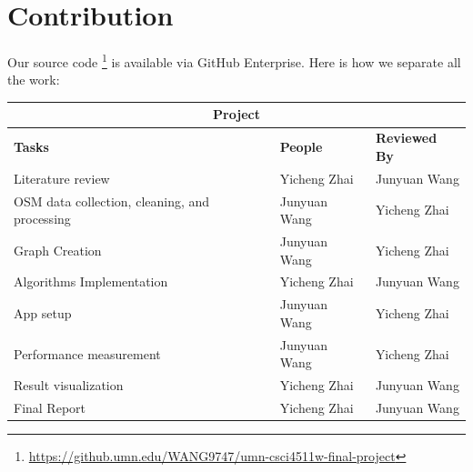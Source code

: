 \documentclass[12pt]{article}
\begin{document}
\section{Contribution}

Our source code \footnote{\url{https://github.umn.edu/WANG9747/umn-csci4511w-final-project}} is available via GitHub Enterprise. 
Here is how we separate all the work:
\begin{table}[hbt!]
\centering
\begin{tabular}{|p{6cm}|p{3cm}|p{3cm}|} \hline
\multicolumn{3}{|c|}{\textbf{Project}} \\ \hline
\textbf{Tasks} & \textbf{People} & \textbf{Reviewed By} \\ \hline
Literature review                                       & Yicheng Zhai & Junyuan Wang \\ \hline
OSM data collection, cleaning, and processing           & Junyuan Wang & Yicheng Zhai \\ \hline
Graph Creation                                          & Junyuan Wang & Yicheng Zhai \\ \hline
Algorithms Implementation                               & Yicheng Zhai & Junyuan Wang \\ \hline
App setup                                               & Junyuan Wang & Yicheng Zhai \\ \hline
Performance measurement                                 & Junyuan Wang & Yicheng Zhai \\ \hline
Result visualization                                    & Yicheng Zhai & Junyuan Wang \\ \hline
Final Report                                            & Yicheng Zhai & Junyuan Wang \\ \hline
\end{tabular}
\end{table}

\newpage
\printbibliography
\end{document}
